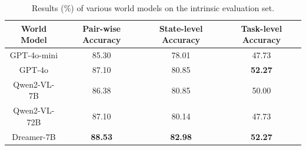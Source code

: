 \begin{table}[htb]
    \centering
    \small
    \begin{tabular}{cccc}
    \toprule
       World Model & Pair-wise Accuracy & State-level Accuracy & Task-level Accuracy \\
       \midrule
       GPT-4o-mini & 85.30 & 78.01 & 47.73 \\
       GPT-4o & 87.10 & 80.85 & \textbf{52.27} \\
       Qwen2-VL-7B & 86.38 & 80.85 & 50.00 \\
       Qwen2-VL-72B & 87.10 & 80.14 & 47.73 \\
       Dreamer-7B & \textbf{88.53} & \textbf{82.98} & \textbf{52.27} \\
    \bottomrule
    \end{tabular}
    \caption{Results (\%) of various world models on the intrinsic evaluation set.}
    \label{tab:intrinsic-eval}
\end{table}